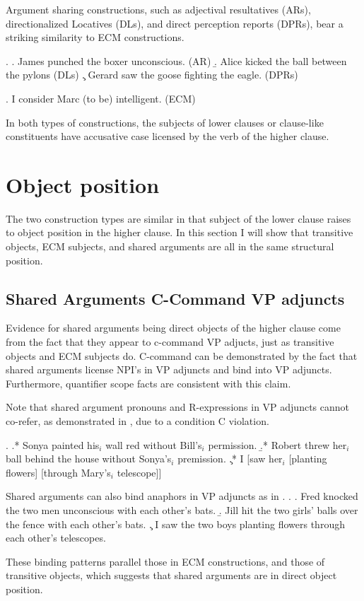 \documentclass[letterpaper]{article}
\begin{document}
Argument sharing constructions, such as adjectival resultatives (ARs), directionalized Locatives (DLs), and direct perception reports (DPRs), bear a striking similarity to ECM constructions.

\ex.
\a. James punched the boxer unconscious. (AR)
\b. Alice kicked the ball between the pylons (DLs)
\c. Gerard saw the goose fighting the eagle. (DPRs)

\ex. I consider Marc (to be) intelligent. (ECM)

In both types of constructions, the subjects of lower clauses or clause-like constituents have accusative case licensed by the verb of the higher clause.

\section{Object position}
The two construction types are similar in that subject of the lower clause raises to object position in the higher clause.
In this section I will show that transitive objects, ECM subjects, and shared arguments are all in the same structural position.

\subsection{Shared Arguments C-Command VP adjuncts}
Evidence for shared arguments being direct objects of the higher clause come from the fact that they appear to c-command VP adjucts, just as transitive objects and ECM subjects do.
C-command can be demonstrated by the fact that shared arguments license NPI's in VP adjuncts and bind into VP adjuncts.
Furthermore, quantifier scope facts are consistent with this claim.

Note that shared argument pronouns and R-expressions in VP adjuncts cannot co-refer, as demonstrated in \Next, due to a condition C violation.

\ex.
\a.* Sonya painted his$_i$ wall red without Bill's$_i$ permission.
\b.* Robert threw her$_i$ ball behind the house without Sonya's$_i$ premission.
\c.* I [saw her$_i$ [planting flowers] [through Mary's$_i$ telescope]] 

Shared arguments can also bind anaphors in VP adjuncts as in \Next.
\ex.
\a. Fred knocked the two men unconscious with each other's bats.
\b. Jill hit the two girls' balls over the fence with each other's bats.
\c. I saw the two boys planting flowers through each other's telescopes.

These binding patterns parallel those in ECM constructions, and those of transitive objects, which suggests that shared arguments are in direct object position.
\end{document}
